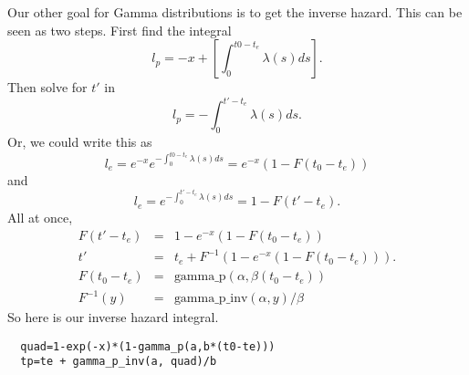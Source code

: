 \documentclass{article}
\begin{document}
Our other goal for Gamma distributions is to get the inverse hazard.
This can be seen as two steps. First find the integral
\begin{equation}
  l_p=-x+\left[\int_0^{t0-t_e}\lambda(s)ds\right].
\end{equation}
Then solve for $t'$ in
\begin{equation}
  l_p=-\int_0^{t'-t_e}\lambda(s)ds.
\end{equation}
Or, we could write this as
\begin{equation}
  l_e =e^{-x}e^{-\int_0^{t0-t_e}\lambda(s)ds}=e^{-x}(1-F(t_0-t_e))
\end{equation}
and
\begin{equation}
  l_e=e^{-\int_0^{t'-t_e}\lambda(s)ds}=1-F(t'-t_e).
\end{equation}
All at once,
\begin{eqnarray}
  F(t'-t_e)&=&1-e^{-x}(1-F(t_0-t_e)) \\
 t'&=&t_e+F^{-1}\left(1-e^{-x}(1-F(t_0-t_e))\right). \\
 F(t_0-t_e)&=&\mbox{gamma\_p}(\alpha,\beta(t_0-t_e)) \\
 F^{-1}(y)&=&\mbox{gamma\_p\_inv}(\alpha, y)/\beta
\end{eqnarray}
So here is our inverse hazard integral.
\begin{lstlisting}
  quad=1-exp(-x)*(1-gamma_p(a,b*(t0-te)))
  tp=te + gamma_p_inv(a, quad)/b
\end{lstlisting}
\end{document}
